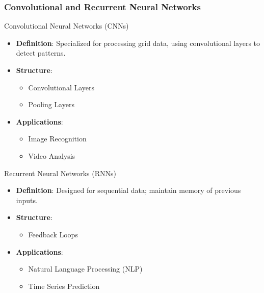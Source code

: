 \documentclass[aspectratio=169]{beamer}
\begin{document}
\begin{frame}[fragile]
    \frametitle{Convolutional and Recurrent Neural Networks}
    
    \begin{block}{Convolutional Neural Networks (CNNs)}
        \begin{itemize}
            \item \textbf{Definition}: Specialized for processing grid data, using convolutional layers to detect patterns.
            \item \textbf{Structure}:
                \begin{itemize}
                    \item Convolutional Layers
                    \item Pooling Layers
                \end{itemize}
            \item \textbf{Applications}:
                \begin{itemize}
                    \item Image Recognition
                    \item Video Analysis
                \end{itemize}
        \end{itemize}
    \end{block}  
    
    \begin{block}{Recurrent Neural Networks (RNNs)}
        \begin{itemize}
            \item \textbf{Definition}: Designed for sequential data; maintain memory of previous inputs.
            \item \textbf{Structure}:
                \begin{itemize}
                    \item Feedback Loops
                \end{itemize}
            \item \textbf{Applications}:
                \begin{itemize}
                    \item Natural Language Processing (NLP)
                    \item Time Series Prediction
                \end{itemize}
        \end{itemize}
    \end{block}
    
\end{frame}
\end{document}
